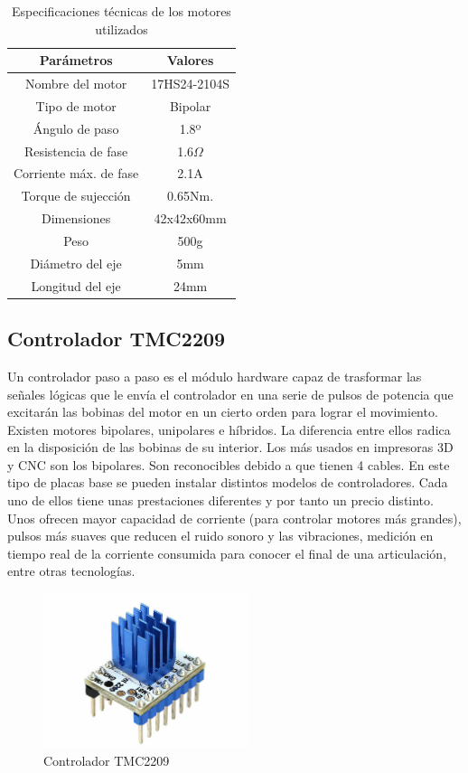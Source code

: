 \begin{table}[H]
\begin{center}
\begin{tabular}{|c|c|}
\hline
\textbf{Parámetros} & \textbf{Valores} \\
\hline
Nombre del motor & 17HS24-2104S \\
Tipo de motor & Bipolar \\
Ángulo de paso & 1.8º \\
Resistencia de fase & 1.6$\Omega$ \\
Corriente máx. de fase & 2.1A \\
Torque de sujección & 0.65Nm. \\
Dimensiones & 42x42x60mm \\
Peso & 500g \\
Diámetro del eje & 5mm \\
Longitud del eje & 24mm \\
\hline
\end{tabular}
\caption{Especificaciones técnicas de los motores utilizados}
\label{cuadro:ejemplo}
\end{center}
\end{table}

\subsection{Controlador TMC2209}
\label{subsec:controladorPAP}
Un controlador paso a paso es el módulo hardware capaz de trasformar las señales lógicas que le envía el controlador en una serie de pulsos de
potencia que excitarán las bobinas del motor en un cierto orden para lograr el movimiento. 
Existen motores bipolares, unipolares e híbridos. La diferencia entre ellos radica en la disposición de las bobinas de su interior. Los más usados 
en impresoras 3D y CNC son los bipolares. Son reconocibles debido a que tienen 4 cables.
En este tipo de placas base se pueden instalar distintos modelos de controladores. Cada uno de ellos tiene unas prestaciones diferentes y por tanto 
un precio distinto. Unos ofrecen mayor capacidad de corriente (para controlar motores más grandes), pulsos más suaves que reducen el 
ruido sonoro y las vibraciones, medición en tiempo real de la corriente consumida para conocer el final de una articulación, entre otras tecnologías.  
\begin{figure} [h!]
    \begin{center}
      \includegraphics[width=6cm]{figs/TMC2209.jpg}
    \end{center}
    \caption{Controlador TMC2209}
    \label{fig:robSoldering}
\end{figure}\ 

